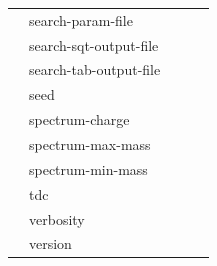 \documentclass{article}
\begin{document}
\begin{table}
\begin{tabular}{lllll}
                     &search-param-file                 &                                 &                                 &                                 \\
                     &search-sqt-output-file            &                                 &                                 &                                 \\
                     &search-tab-output-file            &                                 &                                 &                                 \\
                     &seed                              &                                 &                                 &                                 \\
                     &spectrum-charge                   &                                 &                                 &                                 \\
                     &spectrum-max-mass                 &                                 &                                 &                                 \\
                     &spectrum-min-mass                 &                                 &                                 &                                 \\
                     &tdc                               &                                 &                                 &                                 \\
                     &verbosity                         &                                 &                                 &                                 \\
                     &version                           &                                 &                                 &                                 
\end{tabular}
\end{table}
\end{document}
